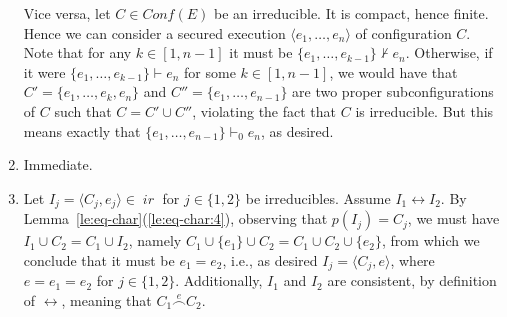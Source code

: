 \documentclass[conference]{IEEEtran}
\renewenvironment{proof}{\begin{IEEEproof}}{\end{IEEEproof}}
\newcommand{\compact}[1]{\ensuremath{\mathop{\mathsf{K}({#1})}}}
\newcommand{\ir}[1]{\ensuremath{\mathop{\mathit{ir}({#1})}}}
\newcommand{\pred}[1]{\ensuremath{\mathit{p}({#1})}}
\newcommand{\esir}[2]{\ensuremath{\langle{#1}, {#2}\rangle}}
\newcommand{\conf}[1]{\ensuremath{\mathit{Conf}({#1})}}
\newcommand{\conn}[1]{\ensuremath{\stackrel{#1}{\frown}}}
\newcommand{\zdom}[0]{\ensuremath{\mathcal{D}}}
\newcommand{\dom}[1]{\ensuremath{\zdom({#1})}}
\newcommand{\interval}[2][1]{\ensuremath{[{#1},{#2}]}}
\begin{document}
\begin{proof}
\begin{enumerate}
    Vice versa, let $C \in \conf{{E}}$ be an irreducible. It is
    compact, hence finite. Hence we can consider a secured execution
    $\langle e_1, \ldots, e_{n} \rangle$
    of configuration $C$. Note that for any $k \in \interval{n-1}$ it
    must be $\{ e_1, \ldots, e_{k-1} \} \not\vdash e_n$.
    Otherwise, if it were $\{ e_1, \ldots, e_{k-1} \} \vdash e_n$ for
    some $k \in \interval{n-1}$, we would have that $C' = \{
    e_1, \ldots, e_{k}, e_n \}$ and $C'' = \{ e_1, \ldots, e_{n-1} \}$
    are two proper subconfigurations of $C$ such that $C = C'
    \cup C''$, violating the fact that $C$ is irreducible. But this
    means exactly that $\{ e_1, \ldots, e_{n-1} \} \vdash_0 e_n$, as
    desired.

  \medskip
  
\item Immediate.

  \medskip

  



\item Let $I_j = \esir{C_j}{e_j} \in \ir{\dom{{E}}}$ for
  $j \in \{1,2\}$ be irreducibles. Assume $I_1 \leftrightarrow I_2$.
  By Lemma~\ref{le:eq-char}(\ref{le:eq-char:4}), observing that
  $\pred{I_j} = C_j$, we must have $I_1 \cup C_2 = C_1 \cup I_2$,
  namely $C_1 \cup \{e_1\} \cup C_2 = C_1 \cup C_2 \cup \{ e_2\}$,
  from which we conclude that it must be $e_1 = e_2$, i.e., as desired
  $I_j = \esir{C_j}{e}$, where $e = e_1 = e_2$ for $j \in \{ 1,2 \}$.
  Additionally, $I_1$ and $I_2$ are consistent, by definition of
  $\leftrightarrow$,
  meaning that $C_1 \conn{e} C_2$.


\end{enumerate}
\end{proof}
\end{document}
